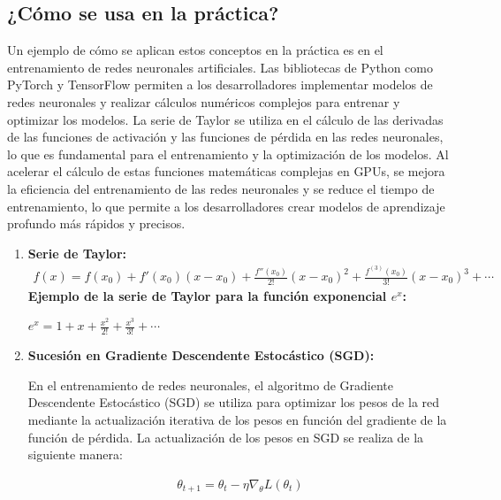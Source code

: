 \documentclass[11pt, a4paper]{article}
\begin{document}
\subsection{\textbf{¿Cómo se usa en la práctica?}}

Un ejemplo de cómo se aplican estos conceptos en la práctica es en el entrenamiento de redes neuronales artificiales. Las bibliotecas de Python como PyTorch y TensorFlow permiten a los desarrolladores implementar modelos de redes neuronales y realizar cálculos numéricos complejos para entrenar y optimizar los modelos. La serie de Taylor se utiliza en el cálculo de las derivadas de las funciones de activación y las funciones de pérdida en las redes neuronales, lo que es fundamental para el entrenamiento y la optimización de los modelos. Al acelerar el cálculo de estas funciones matemáticas complejas en GPUs, se mejora la eficiencia del entrenamiento de las redes neuronales y se reduce el tiempo de entrenamiento, lo que permite a los desarrolladores crear modelos de aprendizaje profundo más rápidos y precisos.

\begin{enumerate}
  \item \textbf{Serie de Taylor:} 
  \begin{align*}
    f(x) = f(x_0) + f'(x_0)(x - x_0) + \frac{f''(x_0)}{2!}(x - x_0)^2 + \frac{f^{(3)}(x_0)}{3!}(x - x_0)^3 + \cdots
  \end{align*}
  \textbf{Ejemplo de la serie de Taylor para la función exponencial $e^x$:} 

  \begin{center}
    $e^x = 1 + x + \frac{x^2}{2!} + \frac{x^3}{3!} + \cdots$
  \end{center}

  \item \textbf{Sucesión en Gradiente Descendente Estocástico (SGD):} 
  
  En el entrenamiento de redes neuronales, el algoritmo de Gradiente Descendente Estocástico (SGD) se utiliza para optimizar los pesos de la red mediante la actualización iterativa de los pesos en función del gradiente de la función de pérdida. La actualización de los pesos en SGD se realiza de la siguiente manera:

  \begin{align*}
    \theta_{t+1} = \theta_t - \eta \nabla_{\theta} L(\theta_t)
  \end{align*}

\end{enumerate}
\end{document}
